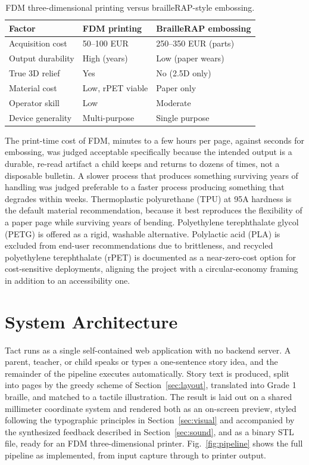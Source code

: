 \documentclass[conference]{IEEEtran}
\begin{document}
\begin{table}[t]
\caption{FDM three-dimensional printing versus brailleRAP-style embossing.}
\label{tab:hardware}
\centering
\begin{tabular}{lll}
\toprule
Factor & FDM printing & BrailleRAP embossing \\
\midrule
Acquisition cost & 50--100 EUR & 250--350 EUR (parts) \\
Output durability & High (years) & Low (paper wears) \\
True 3D relief & Yes & No (2.5D only) \\
Material cost & Low, rPET viable & Paper only \\
Operator skill & Low & Moderate \\
Device generality & Multi-purpose & Single purpose \\
\bottomrule
\end{tabular}
\end{table}

The print-time cost of FDM, minutes to a few hours per page, against seconds for embossing, was judged acceptable specifically because the intended output is a durable, re-read artifact a child keeps and returns to dozens of times, not a disposable bulletin. A slower process that produces something surviving years of handling was judged preferable to a faster process producing something that degrades within weeks. Thermoplastic polyurethane (TPU) at 95A hardness is the default material recommendation, because it best reproduces the flexibility of a paper page while surviving years of bending. Polyethylene terephthalate glycol (PETG) is offered as a rigid, washable alternative. Polylactic acid (PLA) is excluded from end-user recommendations due to brittleness, and recycled polyethylene terephthalate (rPET) is documented as a near-zero-cost option for cost-sensitive deployments, aligning the project with a circular-economy framing in addition to an accessibility one.

\section{System Architecture}\label{sec:architecture}

Tact runs as a single self-contained web application with no backend server. A parent, teacher, or child speaks or types a one-sentence story idea, and the remainder of the pipeline executes automatically. Story text is produced, split into pages by the greedy scheme of Section~\ref{sec:layout}, translated into Grade 1 braille, and matched to a tactile illustration. The result is laid out on a shared millimeter coordinate system and rendered both as an on-screen preview, styled following the typographic principles in Section~\ref{sec:visual} and accompanied by the synthesized feedback described in Section~\ref{sec:sound}, and as a binary STL file, ready for an FDM three-dimensional printer. Fig.~\ref{fig:pipeline} shows the full pipeline as implemented, from input capture through to printer output.
\end{document}
